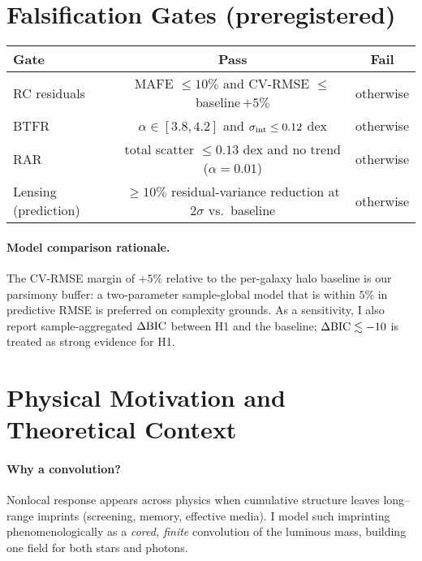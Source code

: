 		\section{Falsification Gates (preregistered)}\label{sec:falsification}
		\begin{center}
			\begin{tabular}{@{}lcc@{}}
				\toprule
				\textbf{Gate} & \textbf{Pass} & \textbf{Fail}\\
				\midrule
				RC residuals & MAFE $\le 10\%$ and CV-RMSE $\le$ baseline\,$+5\%$ & otherwise\\
				BTFR & $\alpha\in[3.8,4.2]$ and $\sigma_{\rm int}\le 0.12$ dex & otherwise\\
				RAR & total scatter $\le 0.13$ dex and no trend ($\alpha\!=\!0.01$) & otherwise\\
				Lensing (prediction)\footnotemark & $\ge 10\%$ residual-variance reduction at $2\sigma$ vs.\ baseline & otherwise\\
				\bottomrule
			\end{tabular}
			\paragraph{Model comparison rationale.}
			The CV-RMSE margin of $+5\%$ relative to the per-galaxy halo baseline is our parsimony buffer:
			a two-parameter sample-global model that is within $5\%$ in predictive RMSE is preferred on
			complexity grounds. As a sensitivity, I also report sample-aggregated $\Delta{\rm BIC}$
			between H1 and the baseline; $\Delta{\rm BIC}\lesssim -10$ is treated as strong evidence for H1.
			
		\end{center}
		\section{Physical Motivation and Theoretical Context}\label{sec:motivation}
		\paragraph{Why a convolution?}
		Nonlocal response appears across physics when cumulative structure leaves long--range imprints (screening, memory, effective media). I model such imprinting phenomenologically as a \emph{cored, finite} convolution of the luminous mass, building one field for both stars and photons.
		
